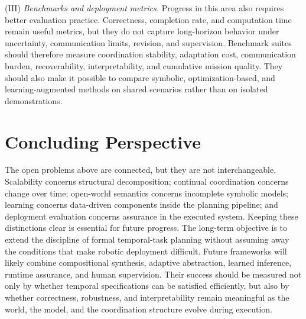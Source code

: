 (III) \emph{Benchmarks and deployment metrics.}
Progress in this area also requires better evaluation practice. Correctness,
completion rate, and computation time remain useful metrics, but they do not
capture long-horizon behavior under uncertainty, communication limits,
revision, and supervision. Benchmark suites should therefore measure
coordination stability, adaptation cost, communication burden, recoverability,
interpretability, and cumulative mission quality. They should also make it
possible to compare symbolic, optimization-based, and learning-augmented
methods on shared scenarios rather than on isolated demonstrations.

\section{Concluding Perspective}
\label{sec:ch07_concluding}

The open problems above are connected, but they are not interchangeable.
Scalability concerns structural decomposition; continual coordination concerns
change over time; open-world semantics concerns incomplete symbolic models;
learning concerns data-driven components inside the planning pipeline; and
deployment evaluation concerns assurance in the executed system. Keeping
these distinctions clear is essential for future progress.
The long-term objective is to extend the discipline of formal temporal-task
planning without assuming away the conditions that make robotic deployment
difficult. Future frameworks will likely combine compositional synthesis,
adaptive abstraction, learned inference, runtime assurance, and human
supervision. Their success should be measured not only by whether temporal
specifications can be satisfied efficiently, but also by whether correctness,
robustness, and interpretability remain meaningful as the world, the model,
and the coordination structure evolve during execution.

